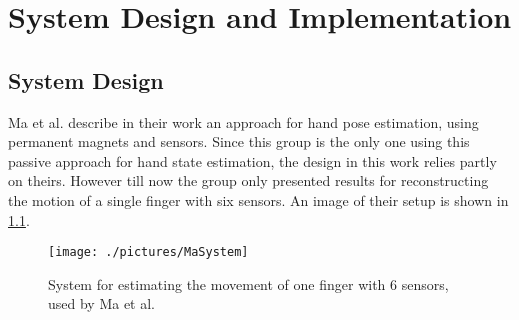 \lhead[\chaptername~\thechapter]{\rightmark}

\rhead[\leftmark]{}

\lfoot[\thepage]{}

\cfoot{}

\rfoot[]{\thepage}

\chapter{System Design and Implementation} \label{cha:sysDesign}

\section{System Design} \label{cha:design}

Ma et al. \cite{ma2010magnetic} describe in their work an approach for hand pose estimation, using permanent magnets and sensors. Since this group is the only one using this passive approach for hand state estimation, the design in this work relies partly on theirs. However till now the group only presented results for reconstructing the motion of a single finger with six sensors. An image of their setup is shown in \ref{fig:MaSystem}.

\begin{figure}[h]
\centering
\texttt{[image: ./pictures/MaSystem]}
\caption{System for estimating the movement of one finger with 6 sensors, used by Ma et al. \cite{ma2010magnetic}}
\label{fig:MaSystem}
\end{figure}


